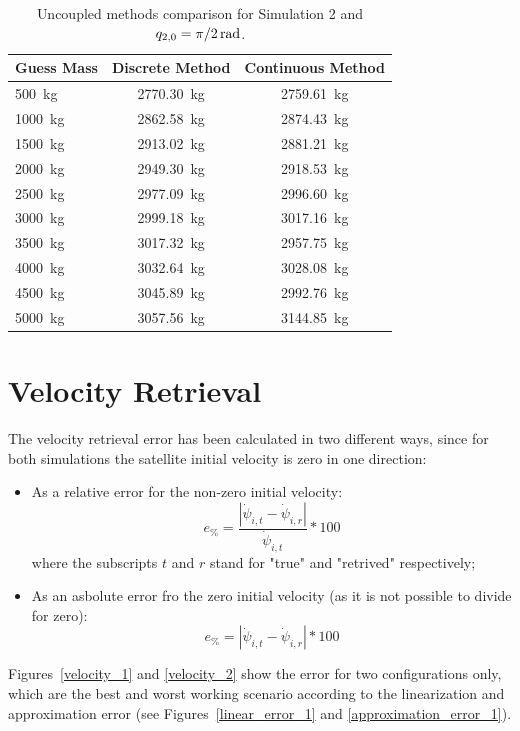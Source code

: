 \documentclass[a4paper,12pt,oneside]{report}
\begin{document}
\begin{table}[b]
  \caption{Uncoupled methods comparison for Simulation 2 and $q_{2,0}=\SI[parse-numbers = false]{\pi/2}{\radian}$.}
  \label{uncoupled_comparison_2}
  \begin{center}
  \begin{tabular}{lcc}
    \toprule
    \textbf{Guess Mass}&\textbf{Discrete Method}&\textbf{Continuous Method}\\
  \midrule
  \SI{500}{\kilogram}&\SI{2770.30}{\kilogram}&\SI{2759.61}{\kilogram}\\
  \SI{1000}{\kilogram}&\SI{2862.58}{\kilogram}&\SI{2874.43}{\kilogram}\\
  \SI{1500}{\kilogram}&\SI{2913.02}{\kilogram}&\SI{2881.21}{\kilogram}\\
  \SI{2000}{\kilogram}&\SI{2949.30}{\kilogram}&\SI{2918.53}{\kilogram}\\
  \SI{2500}{\kilogram}&\SI{2977.09}{\kilogram}&\SI{2996.60}{\kilogram}\\
  \SI{3000}{\kilogram}&\SI{2999.18}{\kilogram}&\SI{3017.16}{\kilogram}\\
  \SI{3500}{\kilogram}&\SI{3017.32}{\kilogram}&\SI{2957.75}{\kilogram}\\
  \SI{4000}{\kilogram}&\SI{3032.64}{\kilogram}&\SI{3028.08}{\kilogram}\\
  \SI{4500}{\kilogram}&\SI{3045.89}{\kilogram}&\SI{2992.76}{\kilogram}\\
  \SI{5000}{\kilogram}&\SI{3057.56}{\kilogram}&\SI{3144.85}{\kilogram}\\
  \bottomrule
  \end{tabular}
  \end{center}
\end{table}
\newpage
\section{Velocity Retrieval}
The velocity retrieval error has been calculated in two different ways, since for both simulations the satellite initial velocity is zero in one direction:
\begin{itemize}
  \item As a relative error for the non-zero initial velocity: \begin{equation}
    e_{\%}=\frac{|\dot{\psi}_{i,t}-\dot{\psi}_{i,r}|}{\dot{\psi}_{i,t}}*100
  \end{equation}
  where the subscripts $t$ and $r$ stand for "true" and "retrived" respectively;
  \item As an asbolute error fro the zero initial velocity (as it is not possible to divide for zero):\begin{equation}
    e_{\%}=|\dot{\psi}_{i,t}-\dot{\psi}_{i,r}|*100
  \end{equation}
\end{itemize}
Figures~\ref{velocity_1} and \ref{velocity_2} show the error for two configurations only, which are the best and worst working scenario according to the linearization and approximation error (see Figures~\ref{linear_error_1} and \ref{approximation_error_1}).\\
\end{document}
